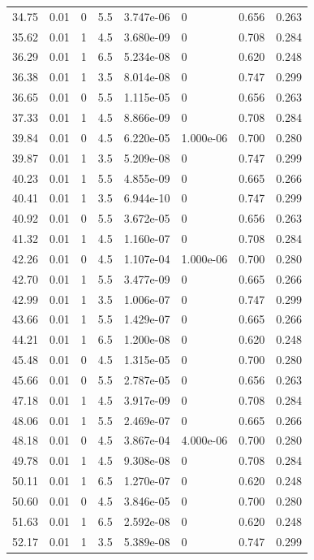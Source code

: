 \documentclass[preview]{standalone}
\begin{document}
{{{\begin{tabular}{L{1.2cm}C{1.2cm} C{0.3cm}C{0.5cm} C{1.4cm}C{1.4cm} C{1.4cm}C{1.4cm}}
  34.75  &  0.01  & 0     & 5.5 &  3.747e-06  & 0  & 0.656 &  0.263   \\ 
  35.62  &  0.01  & 1     & 4.5 &  3.680e-09  & 0  & 0.708 &  0.284   \\ 
  36.29  &  0.01  & 1     & 6.5 &  5.234e-08  & 0  & 0.620 &  0.248   \\ 
  36.38  &  0.01  & 1     & 3.5 &  8.014e-08  & 0  & 0.747 &  0.299   \\ 
  36.65  &  0.01  & 0     & 5.5 &  1.115e-05  & 0  & 0.656 &  0.263   \\ 
  37.33  &  0.01  & 1     & 4.5 &  8.866e-09  & 0  & 0.708 &  0.284   \\ 
  39.84  &  0.01  & 0     & 4.5 &  6.220e-05  & 1.000e-06  & 0.700 &  0.280   \\ 
  39.87  &  0.01  & 1     & 3.5 &  5.209e-08  & 0  & 0.747 &  0.299   \\ 
  40.23  &  0.01  & 1     & 5.5 &  4.855e-09  & 0  & 0.665 &  0.266   \\ 
  40.41  &  0.01  & 1     & 3.5 &  6.944e-10  & 0  & 0.747 &  0.299   \\ 
  40.92  &  0.01  & 0     & 5.5 &  3.672e-05  & 0  & 0.656 &  0.263   \\ 
  41.32  &  0.01  & 1     & 4.5 &  1.160e-07  & 0  & 0.708 &  0.284   \\ 
  42.26  &  0.01  & 0     & 4.5 &  1.107e-04  & 1.000e-06  & 0.700 &  0.280   \\ 
  42.70  &  0.01  & 1     & 5.5 &  3.477e-09  & 0  & 0.665 &  0.266   \\ 
  42.99  &  0.01  & 1     & 3.5 &  1.006e-07  & 0  & 0.747 &  0.299   \\ 
  43.66  &  0.01  & 1     & 5.5 &  1.429e-07  & 0  & 0.665 &  0.266   \\ 
  44.21  &  0.01  & 1     & 6.5 &  1.200e-08  & 0  & 0.620 &  0.248   \\ 
  45.48  &  0.01  & 0     & 4.5 &  1.315e-05  & 0  & 0.700 &  0.280   \\ 
  45.66  &  0.01  & 0     & 5.5 &  2.787e-05  & 0  & 0.656 &  0.263   \\ 
  47.18  &  0.01  & 1     & 4.5 &  3.917e-09  & 0  & 0.708 &  0.284   \\ 
  48.06  &  0.01  & 1     & 5.5 &  2.469e-07  & 0  & 0.665 &  0.266   \\ 
  48.18  &  0.01  & 0     & 4.5 &  3.867e-04  & 4.000e-06  & 0.700 &  0.280   \\ 
  49.78  &  0.01  & 1     & 4.5 &  9.308e-08  & 0  & 0.708 &  0.284   \\ 
  50.11  &  0.01  & 1     & 6.5 &  1.270e-07  & 0  & 0.620 &  0.248   \\ 
  50.60  &  0.01  & 0     & 4.5 &  3.846e-05  & 0  & 0.700 &  0.280   \\ 
  51.63  &  0.01  & 1     & 6.5 &  2.592e-08  & 0  & 0.620 &  0.248   \\ 
  52.17  &  0.01  & 1     & 3.5 &  5.389e-08  & 0  & 0.747 &  0.299   \\ 
\hline 
\end{tabular} 

}}}
\end{document}
